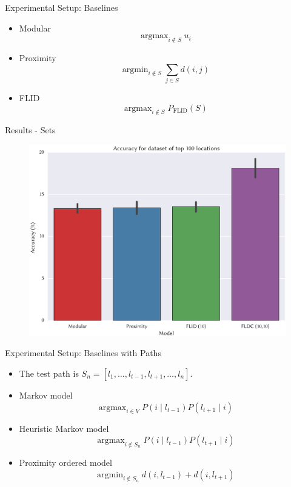 \documentclass{beamer}
\DeclareMathOperator*{\argmin}{argmin}
\DeclareMathOperator*{\argmax}{argmax}
\begin{document}
\begin{frame}{Experimental Setup: Baselines}
  \begin{itemize}
    \item Modular
      \begin{equation*}
         \argmax_{i \notin S} u_{i}
      \end{equation*}
    \item Proximity
      \begin{equation*}
        \argmin_{i \notin S} \sum_{j \in S}d(i,j)
      \end{equation*}
    \item FLID
      \begin{equation*}
        \argmax_{i \notin S} P_{\textrm{FLID}}(S)
      \end{equation*}
  \end{itemize}
\end{frame}

\begin{frame}{Results - Sets}
  \begin{figure}
    \centering
    \includegraphics[width=.85\textwidth]{all_models_100_presentation_a}
  \end{figure}
\end{frame}

\begin{frame}{Experimental Setup: Baselines with Paths}
  \begin{itemize}
    \item The test path is $S_{n} = [l_{1}, \dots, l_{t-1}, l_{t+1}, \dots, l_{n}]$.
    \item Markov model
      \begin{equation*}
        \argmax_{i \in V} P(i \mid l_{t-1})P(l_{t+1} \mid i)
      \end{equation*}
    \item Heuristic Markov model
      \begin{equation*}
        \argmax_{i \notin S_{n}} P(i \mid l_{t-1})P(l_{t+1} \mid i)
      \end{equation*}
    \item Proximity ordered model
      \begin{equation*}
        \argmin_{i \notin S_{n}} d(i, l_{t-1}) + d(i, l_{t+1})
      \end{equation*}
  \end{itemize}
\end{frame}
\end{document}
